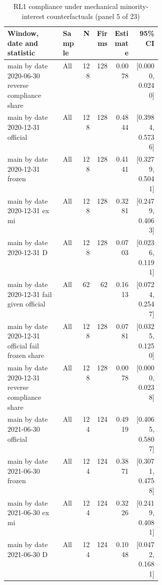 \begin{table}[!htbp]\centering\scriptsize
\caption{RL1 compliance under mechanical minority-interest counterfactuals (panel 5 of 23)}
\begin{threeparttable}
\begin{tabular}{p{0.36\linewidth}lrrrr}
\toprule
Window, date and statistic & Sample & N & Firms & Estimate & 95\% CI \\
\midrule
main by date 2020-06-30 reverse compliance share & All & 128 & 128 & 0.0078 & [0.0000, 0.0240] \\
main by date 2020-12-31 official & All & 128 & 128 & 0.4844 & [0.3984, 0.5736] \\
main by date 2020-12-31 frozen & All & 128 & 128 & 0.4141 & [0.3279, 0.5041] \\
main by date 2020-12-31 ex mi & All & 128 & 128 & 0.3281 & [0.2479, 0.4063] \\
main by date 2020-12-31 D & All & 128 & 128 & 0.0703 & [0.0236, 0.1191] \\
main by date 2020-12-31 fail given official & All & 62 & 62 & 0.1613 & [0.0724, 0.2547] \\
main by date 2020-12-31 official fail frozen share & All & 128 & 128 & 0.0781 & [0.0325, 0.1250] \\
main by date 2020-12-31 reverse compliance share & All & 128 & 128 & 0.0078 & [0.0000, 0.0238] \\
main by date 2021-06-30 official & All & 124 & 124 & 0.4919 & [0.4065, 0.5807] \\
main by date 2021-06-30 frozen & All & 124 & 124 & 0.3871 & [0.3071, 0.4758] \\
main by date 2021-06-30 ex mi & All & 124 & 124 & 0.3226 & [0.2419, 0.4081] \\
main by date 2021-06-30 D & All & 124 & 124 & 0.1048 & [0.0472, 0.1681] \\
\bottomrule
\end{tabular}
\begin{tablenotes}[flushleft]\footnotesize

\end{tablenotes}
\end{threeparttable}
\end{table}
